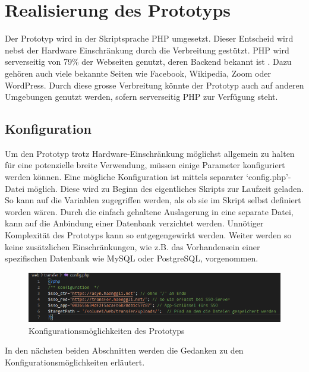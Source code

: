 \chapter{Realisierung des Prototyps}\label{chapter:Realisierung}
Der Prototyp wird in der Skriptsprache PHP umgesetzt. 
Dieser Entscheid wird nebst der Hardware Einschränkung durch die Verbreitung gestützt.
PHP wird serverseitig von 79\% der Webseiten genutzt, deren Backend bekannt ist \cite[gemäss Stand Juni 2020]{w3techs}. 
Dazu gehören auch viele bekannte Seiten wie Facebook, Wikipedia, Zoom oder WordPress.
Durch diese grosse Verbreitung könnte der Prototyp auch auf anderen Umgebungen genutzt werden, sofern serverseitig PHP zur Verfügung steht.

\section{Konfiguration}
Um den Prototyp trotz Hardware-Einschränkung möglichst allgemein zu halten für eine potenzielle breite Verwendung, 
müssen einige Parameter konfiguriert werden können. 
Eine mögliche Konfiguration ist mittels separater `config.php'-Datei möglich. 
Diese wird zu Beginn des eigentliches Skripts zur Laufzeit geladen. So kann auf die Variablen zugegriffen werden,
als ob sie im Skript selbst definiert worden wären. 
Durch die einfach gehaltene Auslagerung in eine separate Datei, kann auf die Anbindung einer Datenbank verzichtet werden. 
Unnötiger Komplexität des Prototyps kann so entgegengewirkt werden. 
Weiter werden so keine zusätzlichen Einschränkungen, wie z.B. das Vorhandensein einer spezifischen Datenbank wie MySQL oder PostgreSQL, vorgenommen.

\begin{figure}[h]
    \centering
    \includegraphics[width=1\linewidth]{content/images/prototyp_konfiguration.png}
    \caption{Konfigurationsmöglichkeiten des Prototyps}
    \label{fig:Konfigurationsmoeglichkeiten_prototyp}
\end{figure}
In den nächsten beiden Abschnitten werden die Gedanken zu den Konfigurationsmöglichkeiten erläutert.

